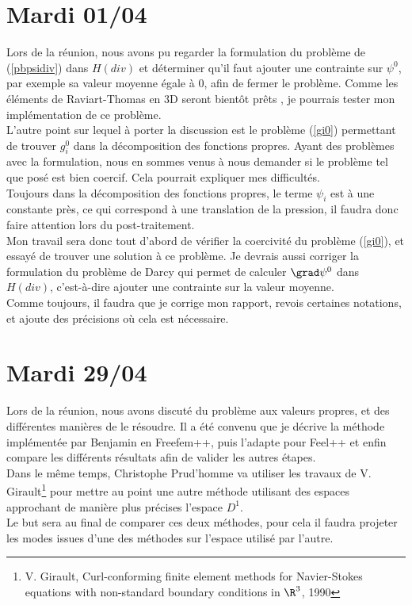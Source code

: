 \section{Mardi 01/04}

Lors de la réunion, nous avons pu regarder la formulation du problème de (\ref{pbpsidiv}) dans $H(div)$ et déterminer qu’il faut ajouter une contrainte sur $\psi^0$, par exemple sa valeur moyenne égale à 0, afin de fermer le problème. Comme les éléments de Raviart-Thomas en 3D seront bientôt prêts , je pourrais tester mon implémentation de ce problème.\\
L’autre point sur lequel à porter la discussion est le problème (\ref{gi0}) permettant de trouver $g_i^0$ dans la décomposition des fonctions propres. Ayant des problèmes avec la formulation, nous en sommes venus à nous demander si le problème tel que posé est bien coercif. Cela pourrait expliquer mes difficultés.\\
Toujours dans la décomposition des fonctions propres, le terme $\psi_i$ est à une constante près, ce qui correspond à une translation de la pression, il faudra donc faire attention lors du post-traitement.\\

Mon travail sera donc tout d’abord de vérifier la coercivité du problème (\ref{gi0}), et essayé de trouver une solution à ce problème. Je devrais aussi corriger la formulation du problème de Darcy qui permet de calculer $\grad\psi^0$ dans $H(div)$, c’est-à-dire ajouter une contrainte sur la valeur moyenne.\\
Comme toujours, il faudra que je corrige mon rapport, revois certaines notations, et ajoute des précisions où cela est nécessaire.

\section{Mardi 29/04}

Lors de la réunion, nous avons discuté du problème aux valeurs propres, et des différentes manières de le résoudre. Il a été convenu que je décrive la méthode implémentée par Benjamin en Freefem++, puis l'adapte pour Feel++ et enfin compare les différents résultats afin de valider les autres étapes.\\
Dans le même temps, Christophe Prud'homme va utiliser les travaux de V. Girault\footnote{V. Girault, Curl-conforming finite element methods for Navier-Stokes equations with non-standard boundary conditions in $\R^3$, 1990} pour mettre au point une autre méthode utilisant des espaces approchant de manière plus précises l'espace $D^1$.\\
Le but sera au final de comparer ces deux méthodes, pour cela il faudra projeter les modes issues d'une des méthodes sur l'espace utilisé par l'autre.\\

